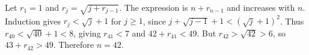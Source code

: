 Let $r_1=1$ and $r_j=\sqrt{j+r_{j-1}}$. The expression is $n+r_{n-1}$ and increases with $n$. Induction gives $r_j<\sqrt j+1$ for $j\ge1$, since $j+\sqrt{j-1}+1<(\sqrt j+1)^2$. Thus $r_{40}<\sqrt{40}+1<8$, giving $r_{41}<7$ and $42+r_{41}<49$. But $r_{42}>\sqrt{42}>6$, so $43+r_{42}>49$. Therefore $\boxed{n=42}$.
